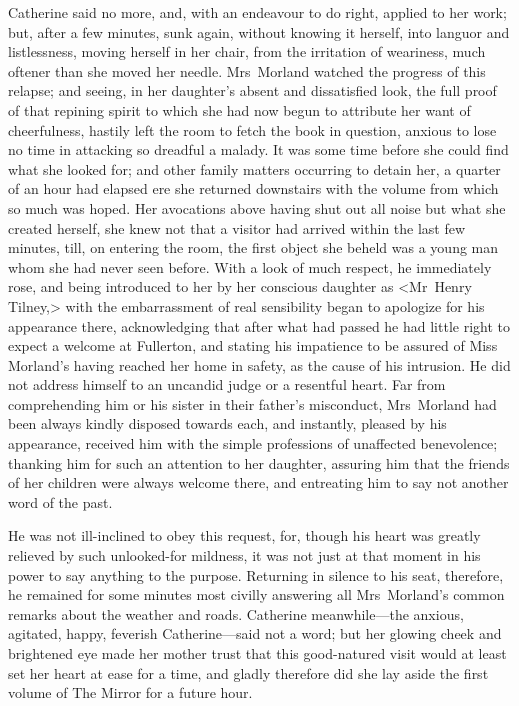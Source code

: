  Catherine said no more, and, with an endeavour to do right, applied to her work; but, after a few minutes, sunk again, without knowing it herself, into languor and listlessness, moving herself in her chair, from the irritation of weariness, much oftener than she moved her needle. Mrs~Morland watched the progress of this relapse; and seeing, in her daughter's absent and dissatisfied look, the full proof of that repining spirit to which she had now begun to attribute her want of cheerfulness, hastily left the room to fetch the book in question, anxious to lose no time in attacking so dreadful a malady. It was some time before she could find what she looked for; and other family matters occurring to detain her, a quarter of an hour had elapsed ere she returned downstairs with the volume from which so much was hoped. Her avocations above having shut out all noise but what she created herself, she knew not that a visitor had arrived within the last few minutes, till, on entering the room, the first object she beheld was a young man whom she had never seen before. With a look of much respect, he immediately rose, and being introduced to her by her conscious daughter as <Mr~Henry Tilney,> with the embarrassment of real sensibility began to apologize for his appearance there, acknowledging that after what had passed he had little right to expect a welcome at Fullerton, and stating his impatience to be assured of Miss Morland's having reached her home in safety, as the cause of his intrusion. He did not address himself to an uncandid judge or a resentful heart. Far from comprehending him or his sister in their father's misconduct, Mrs~Morland had been always kindly disposed towards each, and instantly, pleased by his appearance, received him with the simple professions of unaffected benevolence; thanking him for such an attention to her daughter, assuring him that the friends of her children were always welcome there, and entreating him to say not another word of the past. 

 He was not ill-inclined to obey this request, for, though his heart was greatly relieved by such unlooked-for mildness, it was not just at that moment in his power to say anything to the purpose. Returning in silence to his seat, therefore, he remained for some minutes most civilly answering all Mrs~Morland's common remarks about the weather and roads. Catherine meanwhile—the anxious, agitated, happy, feverish Catherine—said not a word; but her glowing cheek and brightened eye made her mother trust that this good-natured visit would at least set her heart at ease for a time, and gladly therefore did she lay aside the first volume of The Mirror for a future hour. 

